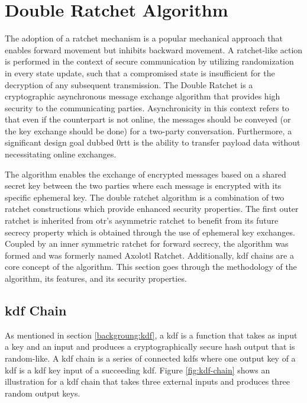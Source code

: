 \section{Double Ratchet Algorithm}
\label{ch:dr}
The adoption of a ratchet mechanism is a popular mechanical approach that enables forward movement but inhibits backward movement. A ratchet-like action is performed in the context of secure communication by utilizing randomization in every state update, such that a compromised state is insufficient for the decryption of any subsequent transmission.
The Double Ratchet is a cryptographic asynchronous message exchange algorithm that provides high security to the communicating parties. Asynchronicity in this context refers to that even if the counterpart is not online, the messages should be conveyed (or the key exchange should be done) for a two-party conversation.
Furthermore, a significant design goal dubbed \gls{0rtt} is the ability to transfer payload data without necessitating online exchanges.
\par
The algorithm enables the exchange of encrypted messages based on a shared secret key between the two parties where each message is encrypted with its specific ephemeral key.
The double ratchet algorithm is a combination of two ratchet constructions which provide enhanced security properties.
The first outer ratchet is inherited from \gls{otr}'s asymmetric ratchet to benefit from its future secrecy property which is obtained through the use of ephemeral key exchanges. Coupled by an inner symmetric ratchet for forward secrecy, the algorithm was formed and was formerly named Axolotl Ratchet. Additionally, \gls{kdf} chains are a core concept of the algorithm. This section goes through the methodology of the algorithm, its features, and its security properties.

\subsection{\gls*{kdf} Chain}
As mentioned in section \ref{backgroung:kdf}, a \gls{kdf} is a function that takes as input a key and an input and produces a cryptographically secure hash output that is random-like.
A \gls{kdf} chain is a series of connected \gls{kdf}s where one output key of a \gls{kdf} is a \gls{kdf} key input of a succeeding \gls{kdf}. Figure \ref{fig:kdf-chain} shows an illustration for a \gls{kdf} chain that takes three external inputs and produces three random output keys.

